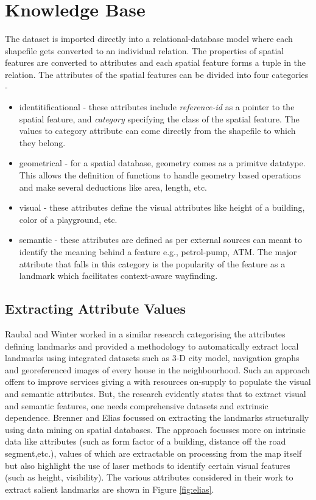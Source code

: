 \documentclass{iitkthesis}
\begin{document}
 \section{Knowledge Base}
  \label{kbase}
The dataset is imported directly into a relational-database model where each shapefile gets converted to an individual relation. The properties of spatial features are converted to attributes and each spatial feature forms a tuple in the relation. The attributes of the spatial features can be divided into four categories -
\begin{itemize}
  \item identitificational - these attributes include \textit{reference-id} as a pointer to the spatial feature, and \textit{category} specifying the class of the spatial feature. The values to category attribute can come directly from the shapefile to which they belong.
  \item geometrical - for a spatial database, geometry comes as a primitve datatype. This allows the definition of functions to handle geometry based operations and make several deductions like area, length, etc.
  \item visual -  these attributes define the visual attributes like height of a building, color of a playground, etc.
  \item semantic - these attributes are defined as per external sources can meant to identify the meaning behind a feature e.g., petrol-pump, ATM.  The major attribute that falls in this category is the popularity of the feature as a landmark which facilitates context-aware wayfinding.
\end{itemize}


\subsection{Extracting Attribute Values}
Raubal and Winter \cite{raubal} worked in a similar research categorising the attributes defining landmarks and provided a methodology to automatically extract local landmarks using integrated datasets such as 3-D city model, navigation graphs and georeferenced images of every house in the neighbourhood. Such an approach offers to improve services giving a with resources on-supply to populate the visual and semantic attributes. But, the research evidently states that to extract visual and semantic features, one needs comprehensive datasets and extrinsic dependence. Brenner and Elias \cite{brenner} focussed on extracting the landmarks structurally using data mining on spatial databases. The approach focusses more on intrinsic data like attributes (such as form factor of a building, distance off the road segment,etc.), values of which are extractable on processing from the map itself but also highlight the use of laser methods to identify certain visual features (such as height, visibility). The various attributes considered in their work to extract salient landmarks are shown in Figure \ref{fig:elias}.
\end{document}
